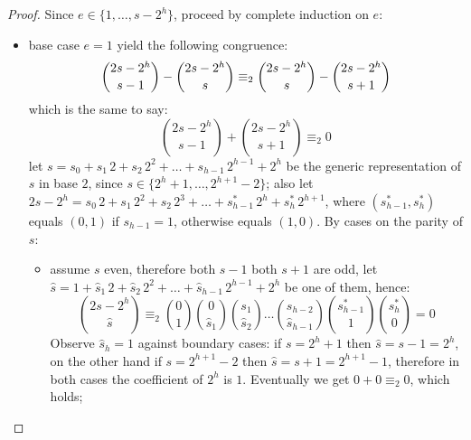 \documentclass[11pt,a4paper]{article} %
\begin{document}
\begin{proof}
    Since $e\in\lbrace1,\ldots,s-2^{h}\rbrace$, proceed by complete induction on $e$:
    \begin{itemize}
        \item base case $e=1$ yield the following congruence:
            \begin{displaymath}
                    {{2s-2^{h}}\choose{s-1}}-{{2s-2^{h}}\choose{s}}
                    \equiv_{2}
                    {{2s-2^{h}}\choose{s}}-{{2s-2^{h}}\choose{s+1}}\\
            \end{displaymath}
            which is the same to say:
            \begin{displaymath}
                    {{2s-2^{h}}\choose{s-1}}+{{2s-2^{h}}\choose{s+1}} \equiv_{2} 0
            \end{displaymath}
            let $s=s_{0}+s_{1}\,2+s_{2}\,2^{2}+\ldots+s_{h-1}\,2^{h-1} + 2^{h}$
            be the generic representation of $s$ in base $2$, since 
            $s\in\lbrace 2^{h}+1,\ldots,2^{h+1}-2 \rbrace$; also  
            let $2s-2^{h}=s_{0}\,2+s_{1}\,2^{2}+s_{2}\,2^{3}+\ldots+s_{h-1}^{*}\,2^{h} + s_{h}^{*}\,2^{h+1}$,
            where $(s_{h-1}^{*},s_{h}^{*})$ equals $(0,1)$ if $s_{h-1}=1$, otherwise equals $(1,0)$.
            By cases on the parity of $s$:
            \begin{itemize}
                \item assume $s$ even, therefore both $s-1$ both $s+1$ are odd, 
                    let $\hat{s}=1+\hat{s}_{1}\,2+\hat{s}_{2}\,2^{2}+\ldots+
                        \hat{s}_{h-1}\,2^{h-1}+2^{h}$ be one of them, hence:
                    \begin{displaymath}
                            {{2s-2^{h}}\choose{\hat{s}}}  
                            \equiv_{2}
                            {{0}\choose{1}} 
                            {{0}\choose{\hat{s}_{1}}}
                            {{s_{1}}\choose{\hat{s}_{2}}}
                            \ldots
                            {{s_{h-2}}\choose{\hat{s}_{h-1}}}
                            {{s_{h-1}^{*}}\choose{1}}
                            {{s_{h}^{*}}\choose{0}} = 0
                    \end{displaymath}
                    Observe $\hat{s}_{h}=1$ against boundary cases:
                    if $s=2^{h}+1$ then $\hat{s}=s-1=2^{h}$, on the other
                    hand if $s=2^{h+1}-2$ then $\hat{s}=s+1=2^{h+1}-1$,
                    therefore in both cases the coefficient of $2^{h}$ is $1$.
                    Eventually we get $0+0 \equiv_{2}0$, which holds;


\end{itemize}
\end{itemize}
\end{proof}
\end{document}
